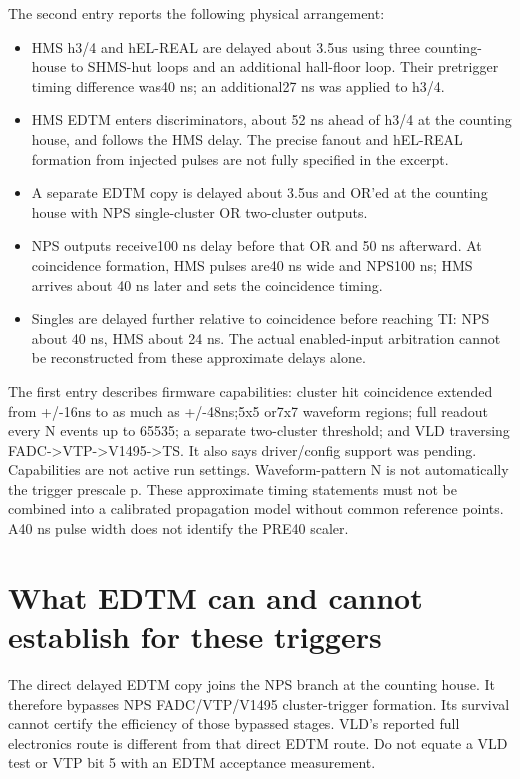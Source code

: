 The second entry reports the following physical arrangement:


\begin{itemize}
\item HMS h3/4 and hEL-REAL are delayed about 3.5us using three counting-house to SHMS-hut loops and an additional hall-floor loop. Their pretrigger timing difference was40 ns; an additional27 ns was applied to h3/4.
\item HMS EDTM enters discriminators, about 52 ns ahead of h3/4 at the counting house, and follows the HMS delay. The precise fanout and hEL-REAL formation from injected pulses are not fully specified in the excerpt.
\item A separate EDTM copy is delayed about 3.5us and OR'ed at the counting house with NPS single-cluster OR two-cluster outputs.
\item NPS outputs receive100 ns delay before that OR and 50 ns afterward. At coincidence formation, HMS pulses are40 ns wide and NPS100 ns; HMS arrives about 40 ns later and sets the coincidence timing.
\item Singles are delayed further relative to coincidence before reaching TI: NPS about 40 ns, HMS about 24 ns. The actual enabled-input arbitration cannot be reconstructed from these approximate delays alone.
\end{itemize}
The first entry describes firmware capabilities: cluster hit coincidence extended from +/-16ns to as much as +/-48ns;5x5 or7x7 waveform regions; full readout every N events up to 65535; a separate two-cluster threshold; and VLD traversing FADC->VTP->V1495->TS. It also says driver/config support was pending. Capabilities are not active run settings. Waveform-pattern N is not automatically the trigger prescale p. These approximate timing statements must not be combined into a calibrated propagation model without common reference points. A40 ns pulse width does not identify the PRE40 scaler.


\section{What EDTM can and cannot establish for these triggers}
The direct delayed EDTM copy joins the NPS branch at the counting house. It therefore bypasses NPS FADC/VTP/V1495 cluster-trigger formation. Its survival cannot certify the efficiency of those bypassed stages. VLD's reported full electronics route is different from that direct EDTM route. Do not equate a VLD test or VTP bit 5 with an EDTM acceptance measurement.


